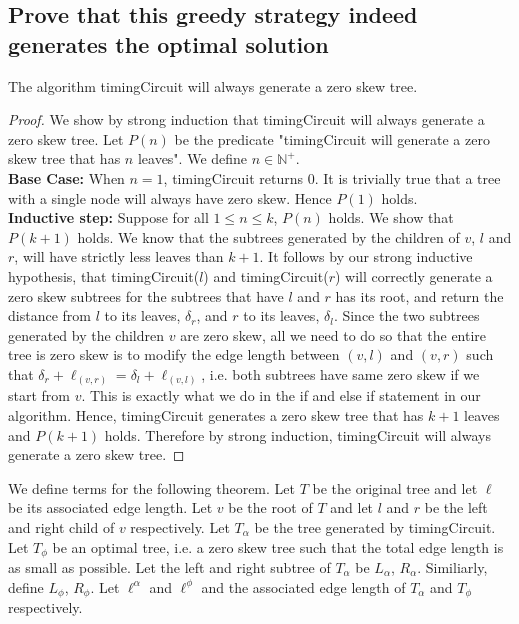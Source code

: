 \documentclass[11pt]{scrartcl}
\begin{document}
	\subsection{
		Prove that this greedy strategy indeed generates the optimal solution
	}
	\begin{lemma}
		The algorithm timingCircuit will always generate a zero skew tree.
	\end{lemma}
	\begin{proof}
		We show by strong induction that timingCircuit will always generate a zero skew tree.
		Let $P(n)$ be the predicate "timingCircuit will generate a zero skew tree that has $n$ leaves".
		We define $n \in \mathbb{N}^+$. \\
		\textbf{Base Case:} When $n = 1$, timingCircuit returns $0$. It is trivially true
		that a tree with a single node will always have zero skew. Hence $P(1)$ holds.\\
		\textbf{Inductive step:} Suppose for all $1 \leq n \leq k$, $P(n)$ holds. We show that $P(k+1)$ holds.
		We know that the subtrees generated by the children of $v$, $l$ and $r$, will have strictly less
		leaves than $k+1$. It follows by our strong inductive hypothesis, that timingCircuit($l$) and timingCircuit($r$)
		will correctly generate a zero skew subtrees for the subtrees that have $l$ and $r$ has its root,
		and return the distance from $l$ to its leaves, $\delta_r$, and $r$ to its leaves, $\delta_l$.
		Since the two subtrees generated by the children $v$ are zero skew, all we need to do so that
		the entire tree is zero skew is to
		modify the edge length between $(v,l)$ and $(v,r)$ such that
		$\delta_r + \ell_{(v,r)} = \delta_l + \ell_{(v,l)}$, i.e. both subtrees have same zero skew
		if we start from $v$. This is exactly what we do in the if and else if statement in our algorithm.
		Hence, timingCircuit generates a zero skew tree that has $k+1$ leaves and $P(k+1)$ holds.
		Therefore by strong induction, timingCircuit will always generate a zero skew tree.
	\end{proof}

	We define terms for the following theorem.
	Let $T$ be the original tree and let $\ell$ be its associated edge length.
	Let $v$ be the root of $T$ and let $l$ and $r$ be the left and right child of $v$ respectively.
	Let $T_\alpha$ be the tree generated by timingCircuit. Let $T_\phi$ be an
	optimal tree, i.e. a zero skew tree such that the total edge length is as small as possible.
	Let the left and right subtree of $T_\alpha$ be $L_\alpha$, $R_\alpha$.
	Similiarly, define $L_\phi$, $R_\phi$.
	Let $\ell^\alpha$ and $\ell^\phi$ and the associated edge length of $T_\alpha$ and $T_\phi$ respectively.
\end{document}
